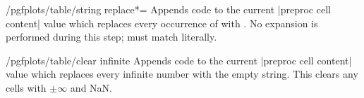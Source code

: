 \begin{stylekey}{/pgfplots/table/string replace*=}
    Appends code to the current |preproc cell content| value which replaces
    every occurrence of  with . No expansion is
    performed during this step;  must match literally.
\begin{codeexample}[pre={\begin{lateximage}},post={\end{lateximage}}]
\end{codeexample}
\end{stylekey}

\begin{stylekey}{/pgfplots/table/clear infinite}
    Appends code to the current |preproc cell content| value which replaces
    every infinite number with the empty string. This clears any cells with
    $\pm \infty$ and NaN.
\end{stylekey}

